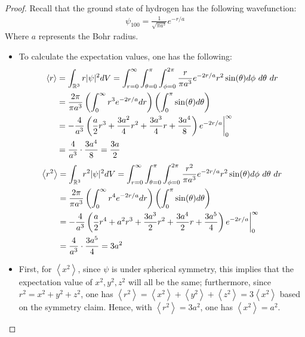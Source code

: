 \documentclass{article}
\begin{document}
\begin{proof}
    
    Recall that the ground state of hydrogen has the following wavefunction:
    \begin{align}
        \psi_{100} = \frac{1}{\sqrt{\pi a^3}}e^{-r/a}
    \end{align}
    Where $a$ represents the Bohr radius.

    \begin{itemize}
        \item[(a)] To calculate the expectation values, one has the following:
        \begin{align}
        \left<r\right> &= \int_{\mathbb{R}^3}r|\psi|^2 dV = \int_{r=0}^{\infty}\int_{\theta=0}^{\pi}\int_{\phi=0}^{2\pi}\frac{r}{\pi a^3}e^{-2r/a}r^2\sin(\theta)d\phi\ d\theta\ dr\\
        &=\frac{2\pi}{\pi a^3}\left(\int_{0}^{\infty}r^3e^{-2r/a}dr\right)\left(\int_{0}^{\pi}\sin(\theta)d\theta\right)\\
        &= -\frac{4}{a^3}\left(\frac{a}{2}r^3 + \frac{3a^2}{4}r^2+\frac{3a^3}{4}r+\frac{3a^4}{8}\right)e^{-2r/a}\bigg|_{0}^{\infty}\\
        &= \frac{4}{a^3}\cdot \frac{3a^4}{8} = \frac{3a}{2}
    \end{align}
    \begin{align}
        \left<r^2\right> &= \int_{\mathbb{R}^3}r^2|\psi|^2dV = \int_{r=0}^{\infty}\int_{\theta=0}^\pi\int_{\phi=0}^{2\pi}\frac{r^2}{\pi a^3}e^{-2r/a}r^2\sin(\theta)d\phi\ d\theta\ dr\\
        &= \frac{2\pi}{\pi a^3}\left(\int_{0}^{\infty}r^4e^{-2r/a}dr\right)\left(\int_{0}^{\pi}\sin(\theta)d\theta\right)\\
        &= -\frac{4}{a^3}\left(\frac{a}{2}r^4+a^2r^3+\frac{3a^3}{2}r^2+\frac{3a^4}{2}r+\frac{3a^5}{4}\right)e^{-2r/a}\bigg|_{0}^{\infty}\\
        &= \frac{4}{a^3}\cdot\frac{3a^5}{4} = 3a^2
    \end{align}

    \hfil

    \item[(b)] First, for $\left<x^2\right>$, since $\psi$ is under spherical symmetry, this implies that the expectation value of $x^2,y^2,z^2$ will all be the same; furthermore, since $r^2=x^2+y^2+z^2$, one has $\left<r^2\right> = \left<x^2\right>+\left<y^2\right>+\left<z^2\right> = 3\left<x^2\right>$ based on the symmetry claim. Hence, with $\left<r^2\right>=3a^2$, one has $\left<x^2\right>=a^2$.
    

\end{itemize}
\end{proof}
\end{document}
